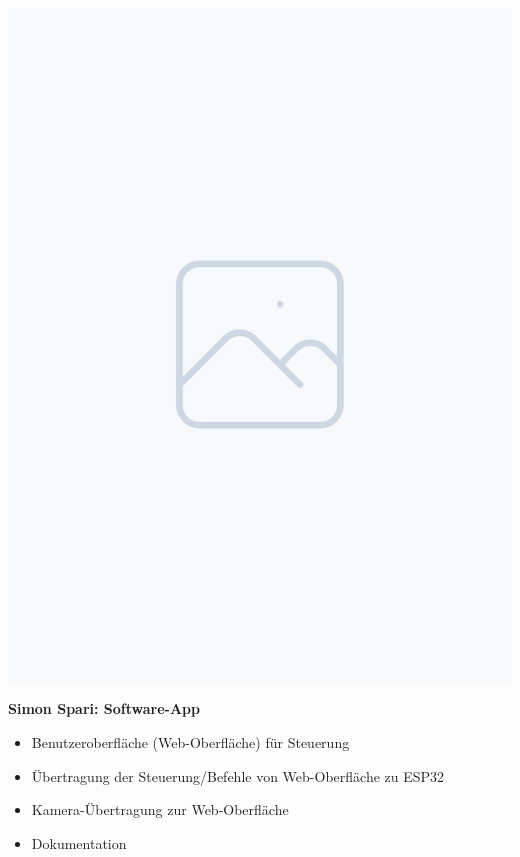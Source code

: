 \documentclass[ngerman,12pt,a4paper]{article}
\begin{document}
\begin{center}
			\begin{minipage}{0.2\textwidth}
				\includegraphics[width=\linewidth]{Pictures/placeholder}
				\label{fig:simon}
			\end{minipage}
			\hfill
			\begin{minipage}{0.65\textwidth}
				\vspace{-20pt}
				\textbf{Simon Spari: Software-App}
				\begin{itemize}
					\item Benutzeroberfläche (Web-Oberfläche) für Steuerung \vspace{-10pt}
					\item Übertragung der Steuerung/Befehle von Web-Oberfläche zu ESP32 \vspace{-10pt}
					\item Kamera-Übertragung zur Web-Oberfläche
					\item Dokumentation \vspace{-10pt}

\end{itemize}
\end{minipage}
\end{center}
\end{document}
